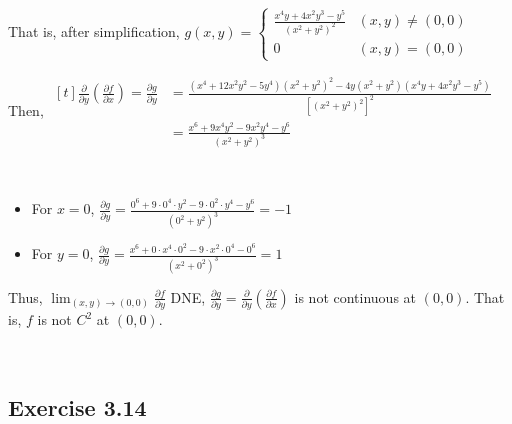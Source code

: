 That is, after simplification, $g(x,y) = 
    \begin{cases}
        \frac{x^4y + 4x^2y^3 - y^5}{(x^2 + y^2)^2} & (x,y) \neq (0,0) \\
        0                                          & (x,y) = (0,0)
    \end{cases}$

Then, 
$\begin{aligned}[t]
    \frac{\partial}{\partial y} \left(\frac{\partial f}{\partial x}\right) = \frac{\partial g}{\partial y}
     & = \frac{(x^4 + 12x^2y^2 - 5y^4)(x^2 + y^2)^2 - 4y(x^2 + y^2)(x^4y + 4x^2y^3 - y^5)}{\left[(x^2 + y^2)^2\right]^2} \\
     & = \frac{x^6 + 9x^4y^2 - 9x^2y^4 - y^6}{(x^2 + y^2)^3}
\end{aligned}$

{~~~}

\begin{itemize}
    \item For $x = 0$, $\frac{\partial g}{\partial y} = \frac{0^6 + 9 \cdot 0^4 \cdot y^2 - 9 \cdot 0^2 \cdot y^4 - y^6}{(0^2 + y^2)^3} = -1$

    \item For $y = 0$, $\frac{\partial g}{\partial y} = \frac{x^6 + 0 \cdot x^4 \cdot 0^2 - 9 \cdot x^2 \cdot 0^4 - 0^6}{(x^2 + 0^2)^3} = 1$
\end{itemize}

Thus, $\lim_{(x,y)\to(0,0)} \frac{\partial f}{\partial y}$ DNE, $\frac{\partial g}{\partial y} = \frac{\partial}{\partial y}\left( \frac{\partial f}{\partial x} \right)$ is not continuous at $(0,0)$. That is, $f$ is not $C^2$ at $(0,0)$. 

{~~~}

\subsection*{Exercise 3.14}

